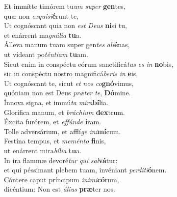 \evenverse Et immítte timórem tu\textit{um} \textit{su}\textit{per} \textbf{gen}tes,~\*\\
\evenverse quæ non \textit{ex}\textit{qui}\textit{si}\textbf{é}runt te,\\
\oddverse Ut cognóscant quia non \textit{est} \textit{De}\textit{us} \textbf{ni}si tu,~\*\\
\oddverse et enárrent ma\textit{gná}\textit{li}\textit{a} \textbf{tu}a.\\
\evenverse Álleva manum tuam super gen\textit{tes} \textit{a}\textit{li}\textbf{é}nas,~\*\\
\evenverse ut vídeant po\textit{tén}\textit{ti}\textit{am} \textbf{tu}am.\\
\oddverse Sicut enim in conspéctu eórum sanctificá\textit{tus} \textit{es} \textit{in} \textbf{no}bis,~\*\\
\oddverse sic in conspéctu nostro magnificá\textit{be}\textit{ris} \textit{in} \textbf{e}is,\\
\evenverse Ut cognóscant te, sicut \textit{et} \textit{nos} \textit{co}\textbf{gnó}vimus,~\*\\
\evenverse quóniam non est Deus \textit{præ}\textit{ter} \textit{te}, \textbf{Dó}mine.\\
\oddverse Ínnova signa, et immú\textit{ta} \textit{mi}\textit{ra}\textbf{bí}lia.~\*\\
\oddverse Glorífica manum, et \textit{brá}\textit{chi}\textit{um} \textbf{dex}trum.\\
\evenverse Éxcita furórem, et \textit{ef}\textit{fún}\textit{de} \textbf{i}ram.~\*\\
\evenverse Tolle adversárium, et afflí\textit{ge} \textit{i}\textit{ni}\textbf{mí}cum.\\
\oddverse Festína tempus, et \textit{me}\textit{mén}\textit{to} \textbf{fi}nis,~\*\\
\oddverse ut enárrent mira\textit{bí}\textit{li}\textit{a} \textbf{tu}a.\\
\evenverse In ira flammæ devoré\textit{tur} \textit{qui} \textit{sal}\textbf{vá}tur:~\*\\
\evenverse et qui péssimant plebem tuam, invéniant \textit{per}\textit{di}\textit{ti}\textbf{ó}nem.\\
\oddverse Cóntere caput príncipum \textit{i}\textit{ni}\textit{mi}\textbf{có}rum,~\*\\
\oddverse dicéntium: Non est \textit{á}\textit{li}\textit{us} \textbf{præ}ter nos.\\
